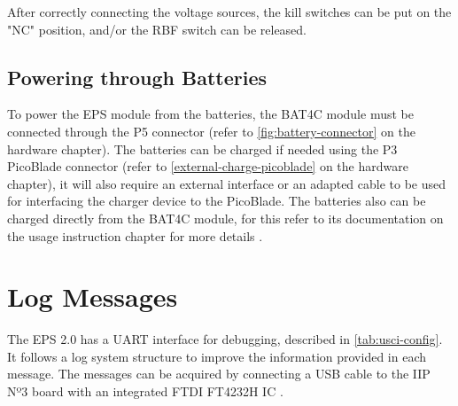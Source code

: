 After correctly connecting the voltage sources, the kill switches can be put on the "NC" position, and/or the RBF switch can be released.


\subsection{Powering through Batteries}

To power the EPS module from the batteries, the BAT4C module must be connected through the P5 connector (refer to \autoref{fig:battery-connector} on the hardware chapter).
The batteries can be charged if needed using the P3 PicoBlade connector (refer to \autoref{external-charge-picoblade} on the hardware chapter), it will also require an external interface or an adapted cable to be used for interfacing the charger device to the PicoBlade.
The batteries also can be charged directly from the BAT4C module, for this refer to its documentation on the usage instruction chapter for more details \cite{bat4c}.


\section{Log Messages}

The EPS 2.0 has a UART interface for debugging, described in \autoref{tab:usci-config}. It follows a log system structure to improve the information provided in each message.
The messages can be acquired by connecting a USB cable to the IIP Nº3 board with an integrated FTDI FT4232H IC \cite{iip}.

